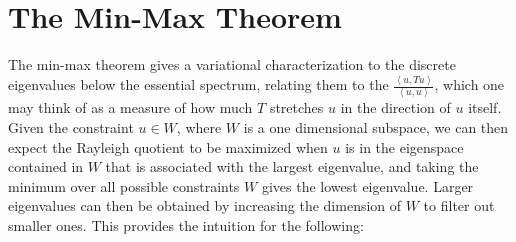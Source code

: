 \documentclass[oneside,reqno,letterpaper]{amsart}
\newcommand{\essspec}{\spec_{\text{ess}}}
\begin{document}
\section{The Min-Max Theorem}
\label{sec:min-max}


The min-max theorem gives a variational characterization to the discrete eigenvalues below the essential spectrum, relating them to the  \(\frac{\left< u, Tu \right>}{\left< u, u \right>}\), which one may think of as a measure of how much \(T\) stretches \(u\) in the direction of \(u\) itself.
Given the constraint \(u \in W\), where \(W\) is a one dimensional subspace, we can then expect the Rayleigh quotient to be maximized when \(u\) is in the eigenspace contained in \(W\) that is associated with the largest eigenvalue, and taking the minimum over all possible constraints \(W\) gives the lowest eigenvalue. 
Larger eigenvalues can then be obtained by increasing the dimension of \(W\) to filter out smaller ones.
This provides the intuition for the following:


\end{document}
